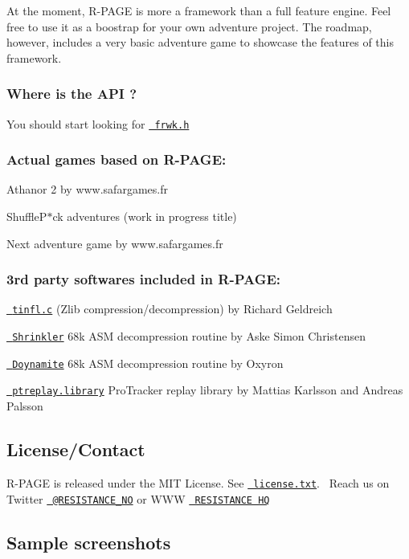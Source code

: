 At the moment, R-\/\+P\+A\+GE is more a framework than a full feature engine. Feel free to use it as a boostrap for your own adventure project. The roadmap, however, includes a very basic adventure game to showcase the features of this framework.

\subsubsection*{Where is the A\+PI ?}

You should start looking for \href{rpage/frwk.h}{\texttt{ frwk.\+h}}

\subsubsection*{Actual games based on R-\/\+P\+A\+GE\+:}


\begin{DoxyItemize}
\item Athanor 2 by www.\+safargames.\+fr
\item Shuffle\+P$\ast$ck adventures (work in progress title)
\item Next adventure game by www.\+safargames.\+fr
\end{DoxyItemize}

\subsubsection*{3rd party softwares included in R-\/\+P\+A\+GE\+:}


\begin{DoxyItemize}
\item \href{https://github.com/richgel999/miniz}{\texttt{ tinfl.\+c}} (Zlib compression/decompression) by Richard Geldreich
\item \href{https://github.com/askeksa/Shrinkler}{\texttt{ Shrinkler}} 68k A\+SM decompression routine by Aske Simon Christensen
\item \href{https://github.com/AxisOxy/Planet-Rocklobster}{\texttt{ Doynamite}} 68k A\+SM decompression routine by Oxyron
\item \href{http://aminet.net/package/mus/play/ptreplay66}{\texttt{ ptreplay.\+library}} Pro\+Tracker replay library by Mattias Karlsson and Andreas Palsson
\end{DoxyItemize}

\subsection*{License/\+Contact}

R-\/\+P\+A\+GE is released under the M\+IT License. See \href{license.txt}{\texttt{ license.\+txt}}.~\newline
 Reach us on Twitter \href{https://twitter.com/RESISTANCE_NO}{\texttt{ @\+R\+E\+S\+I\+S\+T\+A\+N\+C\+E\+\_\+\+NO}} or W\+WW \href{https://resistance.no/}{\texttt{ R\+E\+S\+I\+S\+T\+A\+N\+CE HQ}}

\subsection*{Sample screenshots}

   